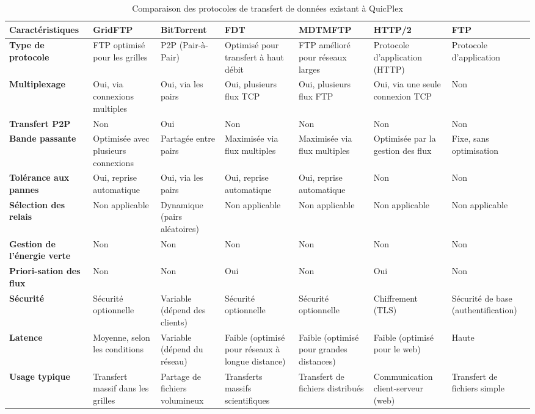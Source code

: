 \begin{table}[h!]
    \centering
     \caption{Comparaison des protocoles de transfert de données existant à QuicPlex}
    \begin{tabular}{|p{3cm}|p{2cm}|p{2cm}|p{2cm}|p{2cm}|p{2cm}|p{1.5cm}|}
        \hline
        \textbf{Caractéristiques} & \textbf{GridFTP} & \textbf{BitTorrent} & \textbf{FDT} & \textbf{MDTMFTP} & \textbf{HTTP/2} & \textbf{FTP} \\
        \hline
        \textbf{Type de protocole} & FTP optimisé pour les grilles & P2P (Pair-à-Pair) & Optimisé pour transfert à haut débit & FTP amélioré pour réseaux larges & Protocole d'application (HTTP) & Protocole d'application \\
        \hline
        \textbf{Multiplexage} & Oui, via connexions multiples & Oui, via les pairs & Oui, plusieurs flux TCP & Oui, plusieurs flux FTP & Oui, via une seule connexion TCP & Non \\
        \hline
        \textbf{Transfert P2P} & Non & Oui & Non & Non & Non & Non \\
        \hline
        \textbf{Bande passante} & Optimisée avec plusieurs connexions & Partagée entre pairs & Maximisée via flux multiples & Maximisée via flux multiples & Optimisée par la gestion des flux & Fixe, sans optimisation \\
        \hline
        \textbf{Tolérance aux pannes} & Oui, reprise automatique & Oui, via les pairs & Oui, reprise automatique & Oui, reprise automatique & Non & Non \\
        \hline
        \textbf{Sélection des relais} & Non applicable & Dynamique (pairs aléatoires) & Non applicable & Non applicable & Non applicable & Non applicable \\
        \hline
        \textbf{Gestion de l'énergie verte} & Non & Non & Non & Non & Non & Non \\
        \hline
        \textbf{Priori-sation des flux} & Non & Non & Oui & Non & Oui & Non \\
        \hline
        \textbf{Sécurité} & Sécurité optionnelle & Variable (dépend des clients) & Sécurité optionnelle & Sécurité optionnelle & Chiffrement (TLS) & Sécurité de base (authentification) \\
        \hline
        \textbf{Latence} & Moyenne, selon les conditions & Variable (dépend du réseau) & Faible (optimisé pour réseaux à longue distance) & Faible (optimisé pour grandes distances) & Faible (optimisé pour le web) & Haute \\
        \hline
        \textbf{Usage typique} & Transfert massif dans les grilles & Partage de fichiers volumineux & Transferts massifs scientifiques & Transfert de fichiers distribués & Communication client-serveur (web) & Transfert de fichiers simple \\
        \hline
    \end{tabular}
\end{table}



